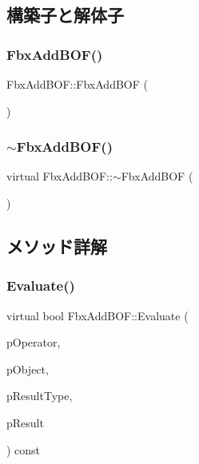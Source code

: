 \subsection{構築子と解体子}
\mbox{\label{class_fbx_add_b_o_f_ac0950ff84a9d2e228949b29a14376dee}} 
\subsubsection{\texorpdfstring{Fbx\+Add\+B\+O\+F()}{FbxAddBOF()}}
{\footnotesize\ttfamily Fbx\+Add\+B\+O\+F\+::\+Fbx\+Add\+B\+OF (\begin{DoxyParamCaption}{ }\end{DoxyParamCaption})}

\mbox{\label{class_fbx_add_b_o_f_a20fa9c0da07357b512939e5c6732b62f}} 
\subsubsection{\texorpdfstring{$\sim$\+Fbx\+Add\+B\+O\+F()}{~FbxAddBOF()}}
{\footnotesize\ttfamily virtual Fbx\+Add\+B\+O\+F\+::$\sim$\+Fbx\+Add\+B\+OF (\begin{DoxyParamCaption}{ }\end{DoxyParamCaption})\hspace{0.3cm}{\ttfamily [virtual]}}



\subsection{メソッド詳解}
\mbox{\label{class_fbx_add_b_o_f_a2b1552f30e4ce028d9b67247ed3b9d06}} 
\subsubsection{\texorpdfstring{Evaluate()}{Evaluate()}}
{\footnotesize\ttfamily virtual bool Fbx\+Add\+B\+O\+F\+::\+Evaluate (\begin{DoxyParamCaption}\item[{const \hyperlink{class_fbx_binding_operator}{Fbx\+Binding\+Operator} $\ast$}]{p\+Operator,  }\item[{const \hyperlink{class_fbx_object}{Fbx\+Object} $\ast$}]{p\+Object,  }\item[{\hyperlink{fbxpropertytypes_8h_a73913a5ddfb20e57c6f25e9e6784bd92}{E\+Fbx\+Type} $\ast$}]{p\+Result\+Type,  }\item[{void $\ast$$\ast$}]{p\+Result }\end{DoxyParamCaption}) const\hspace{0.3cm}{\ttfamily [virtual]}}

